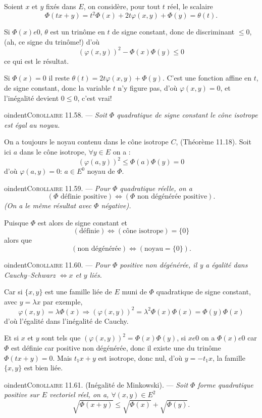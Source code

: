 Soient $x$ et $y$ fixés dans $E$, on considère, pour tout $t$ réel, le scalaire
\[
\Phi(tx+y)=t^2\Phi(x)+2t\varphi(x,y)+\Phi(y)=\theta(t).
\]

Si $\Phi(x)
e0$, $\theta$ est un trinôme en $t$ de signe constant, donc de discriminant $\le0$, (ah, ce signe du trinôme!) d'où
\[
(\varphi(x,y))^2-\Phi(x)\Phi(y)\le0
\]
ce qui est le résultat.

Si $\Phi(x)=0$ il reste $\theta(t)=2t\varphi(x,y)+\Phi(y)$. C'est une fonction affine en $t$, de signe constant, donc la variable $t$ n'y figure pas, d'où $\varphi(x,y)=0$, et l'inégalité devient $0\le0$, c'est vrai! \bookend

\medskip
oindent\textsc{Corollaire 11.58.} --- \emph{Soit $\Phi$ quadratique de signe constant le cône isotrope est égal au noyau.}

On a toujours le noyau contenu dans le cône isotrope $C$, (Théorème 11.18). Soit ici $a$ dans le cône isotrope, $\forall y\in E$ on a :
\[
(\varphi(a,y))^2\le\Phi(a)\Phi(y)=0
\]
d'où $\varphi(a,y)=0$: $a\in E^0$ noyau de $\Phi$. \bookend

\medskip
oindent\textsc{Corollaire 11.59.} --- \emph{Pour $\Phi$ quadratique réelle, on a}
\[
(\Phi\text{ définie positive})\Longleftrightarrow(\Phi\text{ non dégénérée positive}).
\]
\emph{(On a le même résultat avec $\Phi$ négative).}

Puisque $\Phi$ est alors de signe constant et
\[
(\text{définie})\Longleftrightarrow(\text{cône isotrope})=\{0\}
\]
alors que
\[
(\text{non dégénérée})\Longleftrightarrow(\text{noyau}=\{0\}).
\]
\bookend

\medskip
oindent\textsc{Corollaire 11.60.} --- \emph{Pour $\Phi$ positive non dégénérée, il y a égalité dans Cauchy--Schwarz $\Longleftrightarrow x$ et $y$ liés.}

Car si $\{x,y\}$ est une famille liée de $E$ muni de $\Phi$ quadratique de signe constant, avec $y=\lambda x$ par exemple,
\[
\varphi(x,y)=\lambda\Phi(x)
\Longrightarrow
(\varphi(x,y))^2=\lambda^2\Phi(x)\Phi(x)=\Phi(y)\Phi(x)
\]
d'où l'égalité dans l'inégalité de Cauchy.

Et si $x$ et $y$ sont tels que $(\varphi(x,y))^2=\Phi(x)\Phi(y)$, si $x
e0$ on a $\Phi(x)
e0$ car $\Phi$ est définie car positive non dégénérée, donc il existe une  du trinôme $\Phi(tx+y)=0$. Mais $t_1x+y$ est isotrope, donc nul, d'où $y=-t_1x$, la famille $\{x,y\}$ est bien liée. \bookend

\medskip
oindent\textsc{Corollaire 11.61.} (Inégalité de Minkowski). --- \emph{Soit $\Phi$ forme quadratique positive sur $E$ vectoriel réel, on a, $\forall(x,y)\in E^2$}
\[
\sqrt{\Phi(x+y)}\le\sqrt{\Phi(x)}+\sqrt{\Phi(y)}.
\]

